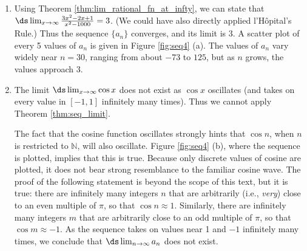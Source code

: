 {\begin{enumerate}
\item		Using Theorem \ref{thm:lim_rational_fn_at_infty}, we can state that $\ds\lim_{x\to\infty} \frac{3x^2-2x+1}{x^2-1000} = 3$. (We could have also directly applied l'H\^opital's Rule.) Thus the sequence $\{a_n\}$ converges, and its limit is 3. A scatter plot of every 5 values of $a_n$ is given in Figure \ref{fig:seq4} (a). The values of $a_n$ vary widely near $n=30$, ranging from about $-73$ to $125$, but as $n$ grows, the values approach 3.


\item		The limit $\ds\lim_{x\to\infty}\cos x$ does not exist as $\cos x$ oscillates (and takes on every value in $[-1,1]$ infinitely many times). Thus we cannot apply Theorem \ref{thm:seq_limit}. 

The fact that the cosine function oscillates strongly hints that $\cos n$, when $n$ is restricted to $\mathbb{N}$, will also oscillate. Figure \ref{fig:seq4} (b), where the sequence is plotted, implies that this is true. Because only discrete values of cosine are plotted, it does not bear strong resemblance to the familiar cosine wave.
The proof of the following statement is beyond the scope of this text, but it is true: there are infinitely many integers $n$ that are arbitrarily (i.e., \textit{very}) close to an even multiple of $\pi$, so that $\cos n \approx 1$. Similarly, there are infinitely many integers $m$ that are arbitrarily close to an odd multiple of $\pi$, so that $\cos m \approx -1$. As the sequence takes on values near 1 and $-1$ infinitely many times, we conclude that $\ds\lim_{n\to\infty}a_n$ does not exist.


\end{enumerate}}
